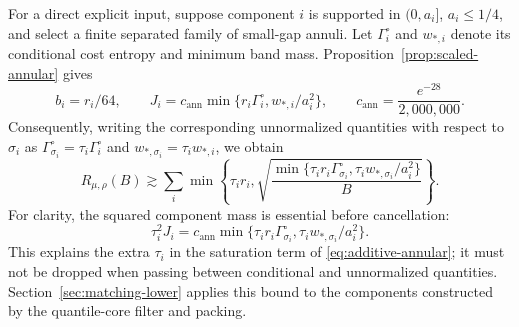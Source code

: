 For a direct explicit input, suppose component $i$ is supported in
$(0,a_i]$, $a_i\le1/4$, and select a finite separated family of small-gap
annuli. Let $\Gamma_i^{\circ}$ and $w_{*,i}$ denote its conditional cost entropy
and minimum band mass. Proposition~\ref{prop:scaled-annular} gives
\[
 b_i=r_i/64,\qquad
 J_i=c_{\mathrm{ann}}
       \min\{r_i\Gamma_i^{\circ},w_{*,i}/a_i^2\},\qquad
 c_{\mathrm{ann}}=\frac{e^{-28}}{2{,}000{,}000}.
\]
Consequently, writing the corresponding unnormalized quantities with
respect to $\sigma_i$ as $\Gamma_{\sigma_i}^{\circ}=\tau_i\Gamma_i^{\circ}$ and
$w_{*,\sigma_i}=\tau_iw_{*,i}$, we obtain
\begin{equation}\label{eq:additive-annular}
 R_{\mu,\rho}(B)\gtrsim
 \sum_i\min\left\{\tau_i r_i,
 \sqrt{\frac{
 \min\{\tau_i r_i\Gamma_{\sigma_i}^{\circ},
           \tau_iw_{*,\sigma_i}/a_i^2\}}B}\right\}.
\end{equation}
For clarity, the squared component mass is essential before cancellation:
\[
 \tau_i^2J_i=c_{\mathrm{ann}}
 \min\{\tau_i r_i\Gamma_{\sigma_i}^{\circ},
             \tau_iw_{*,\sigma_i}/a_i^2\}.
\]
This explains the extra $\tau_i$ in the saturation term of
\eqref{eq:additive-annular}; it must not be dropped when passing between
conditional and unnormalized quantities.
Section~\ref{sec:matching-lower} applies this bound to the components
constructed by the quantile-core filter and packing.
